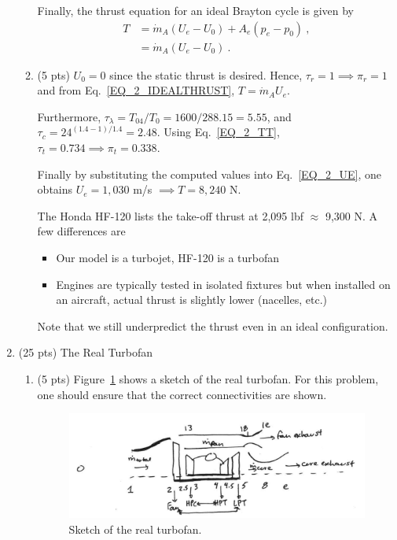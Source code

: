 \documentclass[12pt]{article}
\begin{document}
\begin{enumerate}[label=(\alph*)]
\begin{enumerate}[label=(\roman{*})]
				Finally, the thrust equation for an ideal Brayton cycle is given by
				\begin{equation}
					\label{EQ_2_IDEALTHRUST}					\begin{aligned}
						T&=\dot m_A (U_e-U_0)+A_e(p_e-p_0)\ , \\
						&= \boxed{\dot m_A (U_e-U_0)}\ .
					\end{aligned}
				\end{equation}
			\item (5 pts)
				$U_0=0$ since the static thrust is desired. Hence,  $\tau_r=1\implies \pi_r=1$ and from Eq.~\ref{EQ_2_IDEALTHRUST}, $T=\dot m_A U_e$.
				
				Furthermore, $\tau_\lambda=T_{04}/T_0=1600/288.15=5.55$, and $\tau_c=24^{(1.4-1)/1.4}=2.48$. Using Eq.~\ref{EQ_2_TT}, $\tau_t=0.734\implies \pi_t=0.338$.
				
				Finally by substituting the computed values into Eq.~\ref{EQ_2_UE}, one obtains $U_e=1,030$ m/s $\implies \boxed{T=8,240}$ N.
				
				The Honda HF-120 lists the take-off thrust at 2,095 lbf $\approx$ 9,300 N. A few differences are
				\begin{itemize}
					\item
						Our model is a turbojet, HF-120 is a turbofan
					\item	 
						Engines are typically tested in isolated fixtures but when installed on an aircraft, actual thrust is slightly lower (nacelles, etc.) 	
				\end{itemize} 
				Note that we still underpredict the thrust even in an ideal configuration.
		\end{enumerate}
	\item (25 pts)
		The Real Turbofan
		\begin{enumerate}[label=(\roman{*})]
			\item  (5 pts)
			Figure~\ref{FIG_2_REAL} shows a sketch of the real turbofan. For this problem, one should ensure that the correct connectivities are shown.
			
			\begin{figure}[!ht!]
				\begin{center}
					\includegraphics[width=120mm]{problem2bi.png}
					\caption{\label{FIG_2_REAL} Sketch of the real turbofan.}
				\end{center}
			\end{figure}
		

\end{enumerate}
\end{enumerate}
\end{document}
